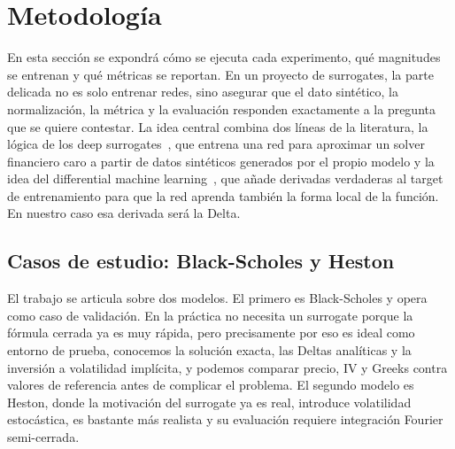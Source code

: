 \documentclass[11pt,a4paper]{article}
\begin{document}

\section{Metodología}\label{sec:metodologia}

En esta sección se expondrá cómo se ejecuta cada experimento, qué magnitudes se entrenan y qué métricas se reportan. En un proyecto de surrogates, la parte delicada no es solo entrenar redes, sino asegurar que el dato sintético, la normalización, la métrica y la evaluación responden exactamente a la pregunta que se quiere contestar. La idea central combina dos líneas de la literatura, la lógica de los deep surrogates~\cite{chen2025}, que entrena una red para aproximar un solver financiero caro a partir de datos sintéticos generados por el propio modelo y la idea del differential machine learning~\cite{huge2020}, que añade derivadas verdaderas al target de entrenamiento para que la red aprenda también la forma local de la función. En nuestro caso esa derivada será la Delta.

\subsection{Casos de estudio: Black-Scholes y Heston}\label{sec:casos-estudio}

El trabajo se articula sobre dos modelos. El primero es Black-Scholes y opera como caso de validación. En la práctica no necesita un surrogate porque la fórmula cerrada ya es muy rápida, pero precisamente por eso es ideal como entorno de prueba, conocemos la solución exacta, las Deltas analíticas y la inversión a volatilidad implícita, y podemos comparar precio, IV y Greeks contra valores de referencia antes de complicar el problema. El segundo modelo es Heston, donde la motivación del surrogate ya es real, introduce volatilidad estocástica, es bastante más realista y su evaluación requiere integración Fourier semi-cerrada.
\end{document}
